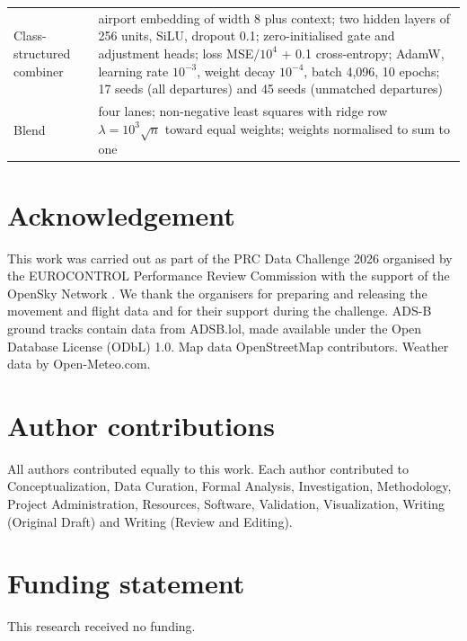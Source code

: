 \documentclass[
  manuscript=article,  %
  layout=preprint,  %
  year=20xx,
  volume=x,
]{extra/joas}
\begin{document}
\begin{table}[htbp!]
\begin{tabular}{p{}p{}}
  Class-structured combiner & airport embedding of width 8 plus context; two hidden layers of 256 units, SiLU, dropout 0.1; zero-initialised gate and adjustment heads; loss MSE$/10^4$ + 0.1 cross-entropy; AdamW, learning rate $10^{-3}$, weight decay $10^{-4}$, batch 4,096, 10 epochs; 17 seeds (all departures) and 45 seeds (unmatched departures) \\
  Blend & four lanes; non-negative least squares with ridge row $\lambda = 10^3\sqrt{n}$ toward equal weights; weights normalised to sum to one \\
  \bottomrule
  \end{tabular}
\end{table}


\section*{Acknowledgement}
This work was carried out as part of the PRC Data Challenge 2026 organised by the EUROCONTROL Performance Review Commission with the support of the OpenSky Network \cite{performancereviewcommission2026prc}. We thank the organisers for preparing and releasing the movement and flight data and for their support during the challenge. ADS-B ground tracks contain data from ADSB.lol, made available under the Open Database License (ODbL) 1.0. Map data \textcopyright{} OpenStreetMap contributors. Weather data by Open-Meteo.com.

\section*{Author contributions}
All authors contributed equally to this work. Each author contributed to Conceptualization, Data Curation, Formal Analysis, Investigation, Methodology, Project Administration, Resources, Software, Validation, Visualization, Writing (Original Draft) and Writing (Review and Editing).

\section*{Funding statement}
This research received no funding.
\end{document}
